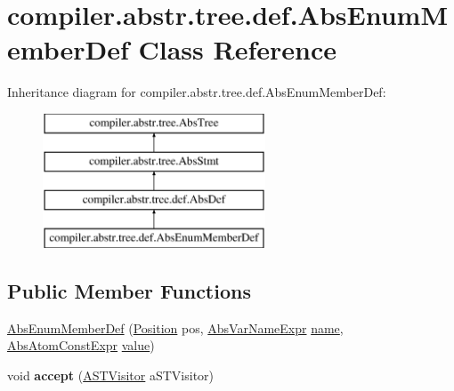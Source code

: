 \hypertarget{classcompiler_1_1abstr_1_1tree_1_1def_1_1_abs_enum_member_def}{}\section{compiler.\+abstr.\+tree.\+def.\+Abs\+Enum\+Member\+Def Class Reference}
\label{classcompiler_1_1abstr_1_1tree_1_1def_1_1_abs_enum_member_def}
Inheritance diagram for compiler.\+abstr.\+tree.\+def.\+Abs\+Enum\+Member\+Def\+:\begin{figure}[H]
\begin{center}
\leavevmode
\includegraphics[height=4.000000cm]{classcompiler_1_1abstr_1_1tree_1_1def_1_1_abs_enum_member_def}
\end{center}
\end{figure}
\subsection*{Public Member Functions}
\begin{DoxyCompactItemize}
\item 
\hyperlink{classcompiler_1_1abstr_1_1tree_1_1def_1_1_abs_enum_member_def_afee3509d8ad95ce037e3de1f77f0ca54}{Abs\+Enum\+Member\+Def} (\hyperlink{classcompiler_1_1_position}{Position} pos, \hyperlink{classcompiler_1_1abstr_1_1tree_1_1expr_1_1_abs_var_name_expr}{Abs\+Var\+Name\+Expr} \hyperlink{classcompiler_1_1abstr_1_1tree_1_1def_1_1_abs_enum_member_def_a0a6c742fb2744551900fd38c08f4862e}{name}, \hyperlink{classcompiler_1_1abstr_1_1tree_1_1expr_1_1_abs_atom_const_expr}{Abs\+Atom\+Const\+Expr} \hyperlink{classcompiler_1_1abstr_1_1tree_1_1def_1_1_abs_enum_member_def_a7395b1d7a49198fb7761cc54990151be}{value})
\item 
\mbox{\label{classcompiler_1_1abstr_1_1tree_1_1def_1_1_abs_enum_member_def_a7986f69e6a40d9de5822d768049e398b}} 
void {\bfseries accept} (\hyperlink{interfacecompiler_1_1abstr_1_1_a_s_t_visitor}{A\+S\+T\+Visitor} a\+S\+T\+Visitor)
\end{DoxyCompactItemize}
